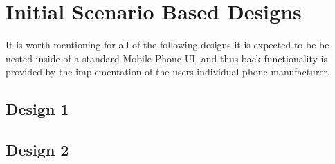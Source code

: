 \documentclass{article}
\begin{document}
\section{Initial Scenario Based Designs}
It is worth mentioning for all of the following designs it is expected to be be nested inside of a standard Mobile Phone UI, and thus back functionality is provided by the implementation of the users individual phone manufacturer.
\subsection{Design 1}



\subsection{Design 2}



\end{document}
